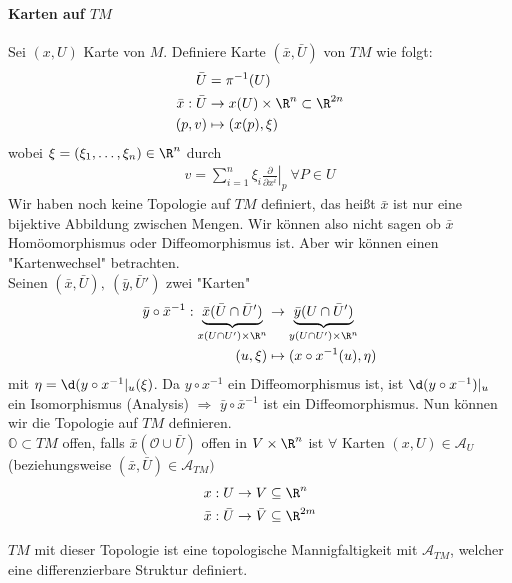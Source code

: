\paragraph{Karten auf $TM$}
Sei $(x, U)$ Karte von $M$. Definiere Karte $(\bar{x}, \bar{U})$ von $TM$ wie folgt:
\begin{align*}
\bar{U} &= \pi^{-1}(U)\\
\bar{x}: \bar{U} &\rightarrow x(U)\times \R^n\subset\R^{2n}\\
(p, v) &\mapsto (x(p), \xi)
\end{align*}
wobei $\xi = (\xi_1, \dots, \xi_n)\in \R^n$ durch
\begin{align*}
v = \sum_{i=1}^n \xi_i \left.\frac{\partial}{\partial x^i}\right|_p\ \forall P \in U
\end{align*}
Wir haben noch keine Topologie auf $TM$ definiert, das heißt $\bar{x}$ ist nur eine bijektive Abbildung zwischen Mengen. Wir können also nicht sagen ob $\bar{x}$ Homöomorphismus oder Diffeomorphismus ist. Aber wir können einen "Kartenwechsel" betrachten.\\
Seinen $(\bar{x}, \bar{U}),\ (\bar{y}, \bar{U}')$ zwei "Karten"
\begin{align*}
\bar{y}\circ\bar{x}^{-1}: \underbrace{\bar{x}(\bar{U}\cap\bar{U}')}_{x(U\cap U')\times\R^n} &\rightarrow \underbrace{\bar{y}(U\cap\bar{U}')}_{y(U\cap U')\times \R^n}\\
(u, \xi) &\mapsto (x\circ x^{-1}(u), \eta)
\end{align*}
mit $\eta = \d (y\circ x^{-1}\vert_u (\xi)$. Da $y\circ x^{-1}$ ein Diffeomorphismus ist, ist $\d (y\circ x^{-1})\vert_u$ ein Isomorphismus (Analysis) $\Rightarrow$ $\bar{y}\circ\bar{x}^{-1}$ ist ein Diffeomorphismus. Nun können wir die Topologie auf $TM$ definieren.\\
$\mathbb{O}\subset TM$ offen, falls $\bar{x}(\mathcal{O}\cup\bar{U})$ offen in  $V\times\R^n$ ist $\forall$ Karten $(x, U) \in \mathcal{A}_U$ (beziehungsweise $(\bar{x}, \bar{U}) \in \mathcal{A}_{TM})$
\begin{align*}
x: U &\rightarrow V \subseteq\R^n\\
\bar{x}: \bar{U} &\rightarrow \bar{V} \subseteq \R^{2m}
\end{align*}

\begin{satz}
$TM$ mit dieser Topologie ist eine topologische Mannigfaltigkeit mit $\mathcal{A}_{TM}$, welcher eine differenzierbare Struktur definiert.
\end{satz}

